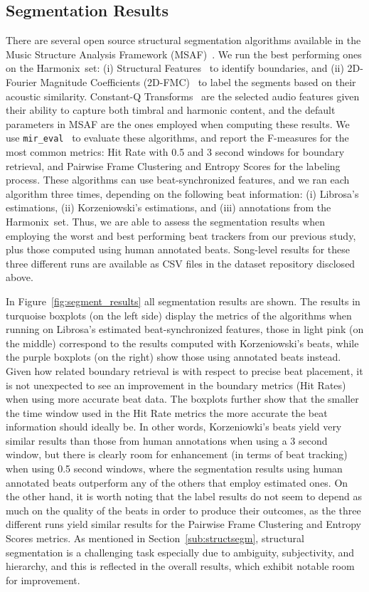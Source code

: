 \documentclass{article}
\newcommand{\setName}{Harmonix}
\begin{document}
\subsection{Segmentation Results}

There are several open source structural segmentation algorithms available in the Music Structure Analysis Framework (MSAF)~\cite{Nieto2016}.
We run the best performing ones on the \setName~set: (i) Structural Features~\cite{Serra2014} to identify boundaries, and (ii) 2D-Fourier Magnitude Coefficients (2D-FMC)~\cite{Nieto2014} to label the segments based on their acoustic similarity.
Constant-Q Transforms~\cite{Schorkhuber2010} are the selected audio features given their ability to capture both timbral and harmonic content, and the default parameters in MSAF are the ones employed when computing these results.
We use \texttt{mir\_eval}~\cite{Raffel2014} to evaluate these algorithms, and report the F-measures for the most common metrics: Hit Rate with 0.5 and 3 second windows for boundary retrieval, and Pairwise Frame Clustering and Entropy Scores for the labeling process.
These algorithms can use beat-synchronized features, and we ran each algorithm three times, depending on the following beat information: (i) Librosa's estimations, (ii) Korzeniowski's estimations, and (iii) annotations from the \setName~set.
Thus, we are able to assess the segmentation results when employing the worst and best performing beat trackers from our previous study, plus those computed using human annotated beats.
Song-level results for these three different runs are available as CSV files in the dataset repository disclosed above.

In Figure~\ref{fig:segment_results} all segmentation results are shown.
The results in turquoise boxplots (on the left side) display the metrics of the algorithms when running on Librosa's estimated beat-synchronized features, those in light pink (on the middle) correspond to the results computed with Korzeniowski's beats, while the purple boxplots (on the right) show those using annotated beats instead.
Given how related boundary retrieval is with respect to precise beat placement, it is not unexpected to see an improvement in the boundary metrics (Hit Rates) when using more accurate beat data.
The boxplots further show that the smaller the time window used in the Hit Rate metrics the more accurate the beat information should ideally be.
In other words, Korzeniowki's beats yield very similar results than those from human annotations when using a 3 second window, but there is clearly room for enhancement (in terms of beat tracking) when using 0.5 second windows, where the segmentation results using human annotated beats outperform any of the others that employ estimated ones.
On the other hand, it is worth noting that the label results do not seem to depend as much on the quality of the beats in order to produce their outcomes, as the three different runs yield similar results for the Pairwise Frame Clustering and Entropy Scores metrics.
As mentioned in Section~\ref{sub:structsegm}, structural segmentation is a challenging task especially due to ambiguity, subjectivity, and hierarchy, and this is reflected in the overall results, which exhibit notable room for improvement.
\end{document}
